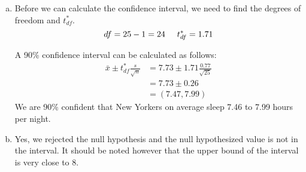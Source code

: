 %

{
\begin{enumerate}[(a)]
\setlength{\itemsep}{0mm}
\item Before we can calculate the confidence interval, we need to find the degrees of freedom and $t^*_{df}$.
\[ df = 25 - 1 = 24 \hspace{5mm} t^*_{df} = 1.71\]

A 90\% confidence interval can be calculated as follows:
\begin{align*}
\bar{x} \pm t^*_{df} \frac{s}{\sqrt{n}} &= 7.73 \pm 1.71\frac{0.77}{\sqrt{25}} \\
&= 7.73 \pm 0.26 \\
&= (7.47, 7.99)
\end{align*}
We are 90\% confident that New Yorkers on average sleep 7.46 to 7.99 hours per night.

\item Yes, we rejected the null hypothesis and the null hypothesized value is not in the interval. It should be noted however that the upper bound of the interval is very close to 8. 

\end{enumerate}

}

%

